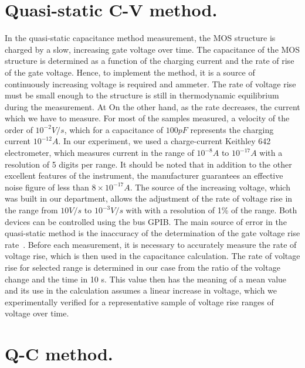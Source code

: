 \section{Quasi-static C-V method.}\label{sec:3.2}

In the quasi-static capacitance method measurement, the MOS structure
is charged by a slow, increasing gate voltage over time. The
capacitance of the MOS structure is determined as a function of the
charging current and the rate of rise of the gate voltage.  Hence, to
implement the method, it is a source of continuously increasing
voltage is required and ammeter. The rate of voltage rise must be
small enough to the structure is still in thermodynamic equilibrium
during the measurement. At On the other hand, as the rate decreases,
the current which we have to measure. For most of the samples
measured, a velocity of the order of $10^{-2}V/s$, which for a
capacitance of $100pF$ represents the charging current $10^{-12}A$. In
our experiment, we used a charge-current Keithley 642 electrometer,
which measures current in the range of $10^{-8}A$ to $10^{-17}A$ with
a resolution of 5 digits per range.  It should be noted that in
addition to the other excellent features of the instrument, the
manufacturer guarantees an effective noise figure of less than
$8\times10^{-17}A$. The source of the increasing voltage, which was
built in our department, allows the adjustment of the rate of voltage
rise in the range from $10V/s$ to $10^{-3}V/s$ with with a resolution
of 1\% of the range. Both devices can be controlled using the bus
GPIB.  The main source of error in the quasi-static method is the
inaccuracy of the determination of the gate voltage rise
rate~\cite{1.5}. Before each measurement, it is necessary to
accurately measure the rate of voltage rise, which is then used in the
capacitance calculation. The rate of voltage rise for selected range
is determined in our case from the ratio of the voltage change and the
time in 10 s. This value then has the meaning of a mean value and its
use in the calculation assumes a linear increase in voltage, which we
experimentally verified for a representative sample of voltage rise
ranges of voltage over time.

\section{Q-C method.}\label{sec:3.3}


